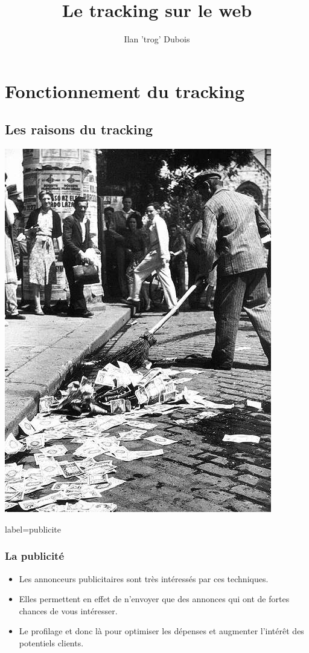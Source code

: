 \documentclass{beamer}
\title{Le tracking sur le web}
\author{\cc Ilan 'trog' Dubois}
\begin{document}
    \begin{frame}
        \titlepage
    \end{frame}
    \section{Fonctionnement du tracking}
    \subsection{Les raisons du tracking}
        \begin{frame}
            \begin{center}
                \includegraphics[scale=0.75]{img/money.jpg}
            \end{center}
        \end{frame}
        \begin{frame}{label=publicite}
            \frametitle{La publicité}
            \begin{center}
                \begin{itemize}
                    \item Les annonceurs publicitaires sont très intéressés par ces techniques.
                    \pause
                    \item Elles permettent en effet de n'envoyer que des annonces qui ont de fortes chances de vous intéresser.
                    \pause
                    \item Le profilage et donc là pour optimiser les dépenses et augmenter l'intérêt des potentiels clients.
                \end{itemize}
            \end{center}
        \end{frame}
\end{document}
